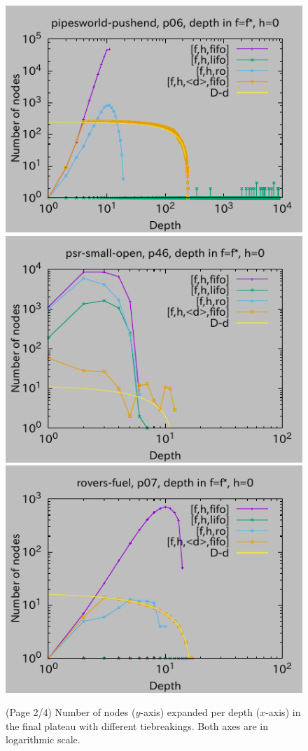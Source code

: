 \begin{figure}[htbp]
\includegraphics{img/depth/pipesworld-pushend/p06.pdf}
\includegraphics{img/depth/psr-small-open/p46.pdf}
\includegraphics{img/depth/rovers-fuel/p07.pdf}
 \caption{(Page 2/4) Number of nodes ($y$-axis) expanded per depth ($x$-axis) in
 the final plateau with different tiebreakings. Both axes are in logarithmic scale.
 }
 \label{fig:depth-histogram2}
\end{figure}

